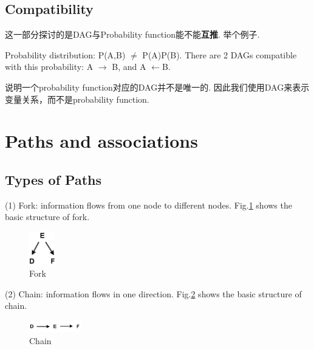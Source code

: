 \subsection{Compatibility}
这一部分探讨的是DAG与Probability function能不能{\bfseries 互推}. 举个例子.
\begin{ex}
Probability distribution: P(A,B) $ \neq$ P(A)P(B). There are 2 DAGs compatible with this probability:
A $\longrightarrow$ B, and A $\longleftarrow $B.
\end{ex}

说明{\color{red}一个probability function对应的DAG并不是唯一的}.
因此我们使用DAG来表示变量关系，而不是probability function.


\newpage\section{Paths and associations}
\subsection{Types of Paths}
(1) Fork: information flows from one node to different nodes. Fig.\ref{fork} shows the basic structure of fork.
	\begin{figure}[htbp]
	\setlength{\abovecaptionskip}{0pt}     %
	\setlength{\belowcaptionskip}{10pt}
	\vspace{-0cm}  %
	\setlength{\abovecaptionskip}{-0cm}   %
	\setlength{\belowcaptionskip}{-0cm}   %
	\centering
	\includegraphics[width=0.1\textwidth]{figure/fork.png}
	\caption{Fork}
	\label{fork}
    \end{figure}

(2) Chain: information flows in one direction. Fig.\ref{chain} shows the basic structure of chain.
	\begin{figure}[htbp]
	\setlength{\abovecaptionskip}{0pt}     %
	\setlength{\belowcaptionskip}{10pt}
	\vspace{-0cm}  %
	\setlength{\abovecaptionskip}{-0cm}   %
	\setlength{\belowcaptionskip}{-0cm}   %
	\centering
	\includegraphics[width=0.2\textwidth]{figure/chain.png}
	\caption{Chain}
	\label{chain}
    \end{figure}


